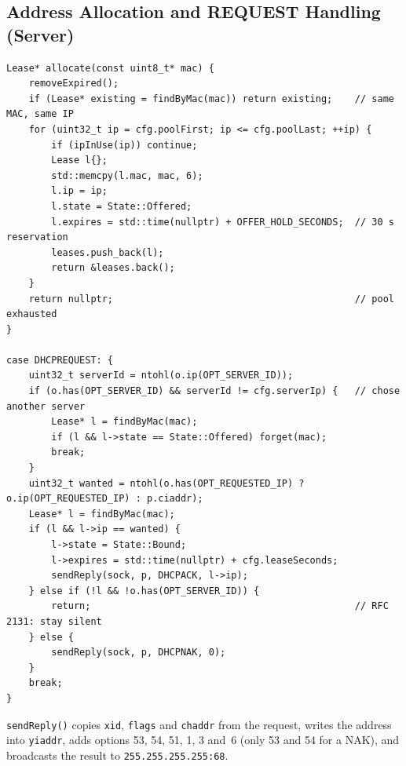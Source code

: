 \documentclass[11pt]{article}
\begin{document}
\subsection{Address Allocation and REQUEST Handling (Server)}
\begin{lstlisting}
Lease* allocate(const uint8_t* mac) {
    removeExpired();
    if (Lease* existing = findByMac(mac)) return existing;    // same MAC, same IP
    for (uint32_t ip = cfg.poolFirst; ip <= cfg.poolLast; ++ip) {
        if (ipInUse(ip)) continue;
        Lease l{};
        std::memcpy(l.mac, mac, 6);
        l.ip = ip;
        l.state = State::Offered;
        l.expires = std::time(nullptr) + OFFER_HOLD_SECONDS;  // 30 s reservation
        leases.push_back(l);
        return &leases.back();
    }
    return nullptr;                                           // pool exhausted
}

case DHCPREQUEST: {
    uint32_t serverId = ntohl(o.ip(OPT_SERVER_ID));
    if (o.has(OPT_SERVER_ID) && serverId != cfg.serverIp) {   // chose another server
        Lease* l = findByMac(mac);
        if (l && l->state == State::Offered) forget(mac);
        break;
    }
    uint32_t wanted = ntohl(o.has(OPT_REQUESTED_IP) ? o.ip(OPT_REQUESTED_IP) : p.ciaddr);
    Lease* l = findByMac(mac);
    if (l && l->ip == wanted) {
        l->state = State::Bound;
        l->expires = std::time(nullptr) + cfg.leaseSeconds;
        sendReply(sock, p, DHCPACK, l->ip);
    } else if (!l && !o.has(OPT_SERVER_ID)) {
        return;                                               // RFC 2131: stay silent
    } else {
        sendReply(sock, p, DHCPNAK, 0);
    }
    break;
}
\end{lstlisting}
\texttt{sendReply()} copies \texttt{xid}, \texttt{flags} and \texttt{chaddr} from the
request, writes the address into \texttt{yiaddr}, adds options 53, 54, 51, 1, 3 and~6
(only 53 and 54 for a NAK), and broadcasts the result to \texttt{255.255.255.255:68}.
\end{document}
